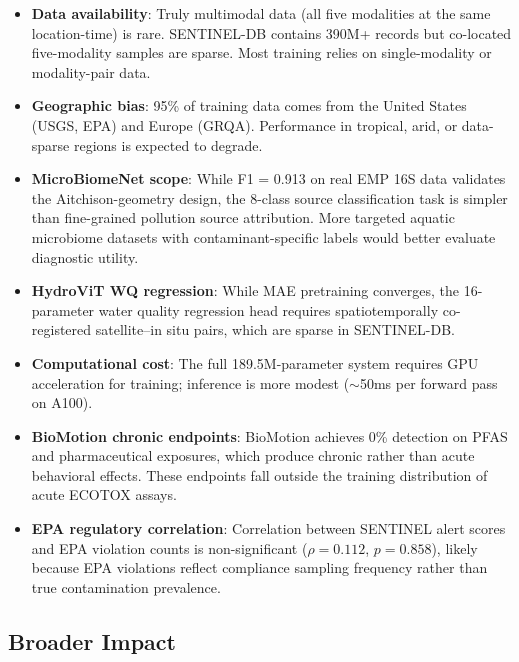 \begin{itemize}
    \item \textbf{Data availability}: Truly multimodal data (all five
    modalities at the same location-time) is rare. SENTINEL-DB contains
    390M+ records but co-located five-modality samples are sparse. Most
    training relies on single-modality or modality-pair data.

    \item \textbf{Geographic bias}: 95\% of training data comes from
    the United States (USGS, EPA) and Europe (GRQA). Performance in
    tropical, arid, or data-sparse regions is expected to degrade.

    \item \textbf{MicroBiomeNet scope}: While F1 = 0.913 on real EMP 16S
    data validates the Aitchison-geometry design, the 8-class source
    classification task is simpler than fine-grained pollution source
    attribution. More targeted aquatic microbiome datasets with
    contaminant-specific labels would better evaluate diagnostic utility.

    \item \textbf{HydroViT WQ regression}: While MAE pretraining converges,
    the 16-parameter water quality regression head requires spatiotemporally
    co-registered satellite--in situ pairs, which are sparse in SENTINEL-DB.

    \item \textbf{Computational cost}: The full 189.5M-parameter system
    requires GPU acceleration for training; inference is more modest
    ($\sim$50ms per forward pass on A100).

    \item \textbf{BioMotion chronic endpoints}: BioMotion achieves 0\%
    detection on PFAS and pharmaceutical exposures, which produce chronic
    rather than acute behavioral effects. These endpoints fall outside the
    training distribution of acute ECOTOX assays.

    \item \textbf{EPA regulatory correlation}: Correlation between
    SENTINEL alert scores and EPA violation counts is non-significant
    ($\rho = 0.112$, $p = 0.858$), likely because EPA violations reflect
    compliance sampling frequency rather than true contamination prevalence.
\end{itemize}

\subsection{Broader Impact}

